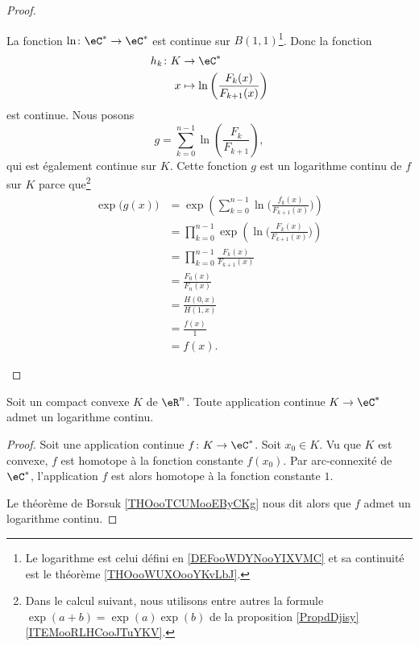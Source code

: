 \begin{proof}
\begin{subproof}
        La fonction \( \ln\colon \eC^*\to \eC^*\) est continue sur \( B(1,1)\)\footnote{Le logarithme est celui défini en \ref{DEFooWDYNooYIXVMC} et sa continuité est le théorème \ref{THOooWUXOooYKvLbJ}.}. Donc la fonction
        \begin{equation}
            \begin{aligned}
                h_k\colon K&\to \eC^* \\
            x&\mapsto \ln\left( \frac{ F_k(x) }{ F_{k+1}(x) } \right) 
            \end{aligned}
        \end{equation}
        est continue. Nous posons
        \begin{equation}
            g=\sum_{k=0}^{n-1}\ln\left( \frac{ F_k }{ F_{k+1} } \right),
        \end{equation}
        qui est également continue sur \( K\). Cette fonction \( g\) est un logarithme continu de \( f\) sur \( K\) parce que\footnote{Dans le calcul suivant, nous utilisons entre autres la formule \( \exp(a+b)=\exp(a)\exp(b)\) de la proposition \ref{PropdDjisy}\ref{ITEMooRLHCooJTuYKV}.}
        \begin{subequations}
            \begin{align}
                \exp\big( g(x) \big)&=\exp\left( \sum_{k=0}^{n-1} \ln\Big( \frac{ f_k(x) }{ F_{k+1}(x) } \Big) \right)\\
                &=\prod_{k=0}^{n-1}\exp\left( \ln\big( \frac{ F_k(x) }{ F_{k+1}(x) } \big) \right)\\
                &=\prod_{k=0}^{n-1}\frac{ F_k(x) }{ F_{k+1}(x) }\\
                &=\frac{ F_0(x) }{ F_n(x) }\\
                &=\frac{ H(0,x) }{ H(1,x) }\\
                &=\frac{ f(x) }{ 1 }\\
                &=f(x).
            \end{align}
        \end{subequations}
    \end{subproof}
\end{proof}

\begin{corollary}
    Soit un compact convexe \( K\) de \( \eR^n\). Toute application continue \( K\to \eC^*\) admet un logarithme continu.
\end{corollary}

\begin{proof}
    Soit une application continue \( f\colon K\to \eC^*\). Soit \( x_0\in K\). Vu que \( K\) est convexe, \( f\) est homotope à la fonction constante \( f(x_0)\). Par arc-connexité de \( \eC^*\), l'application \( f\) est alors homotope à la fonction constante \( 1\).

    Le théorème de Borsuk \ref{THOooTCUMooEByCKg} nous dit alors que \( f\) admet un logarithme continu.
\end{proof}

